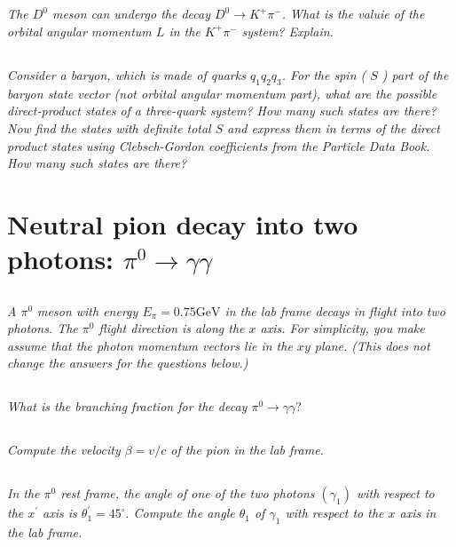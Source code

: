 \documentclass{article}
\begin{document}
\subsection{}
\textit{The $D^{0}$ meson can undergo the decay $D^{0} \rightarrow K^{+} \pi^{-}$. What is the valuie of the orbital angular momentum $L$ in the $K^{+} \pi^{-}$ system? Explain.}



\subsection{}
\textit{Consider a baryon, which is made of quarks $q_{1} q_{2} q_{3}$. For the spin ( $S$ ) part of the baryon state vector (not orbital angular momentum part), what are the possible direct-product states of a three-quark system? How many such states are there? Now find the states with definite total $S$ and express them in terms of the direct product states using Clebsch-Gordon coefficients from the Particle Data Book. How many such states are there?}

\newpage

\section{Neutral pion decay into two photons: $\pi^{0} \rightarrow \gamma \gamma$}


\subsection{}
\textit{A $\pi^{0}$ meson with energy $E_{\pi}=0.75 \mathrm{GeV}$ in the lab frame decays in flight into two photons. The $\pi^{0}$ flight direction is along the $x$ axis. For simplicity, you make assume that the photon momentum vectors lie in the $x y$ plane. (This does not change the answers for the questions below.)}


\subsection{}
\textit{What is the branching fraction for the decay $\pi^{0} \rightarrow \gamma \gamma ?$}


\subsection{}
\textit{Compute the velocity $\beta=v / c$ of the pion in the lab frame.}


\subsection{}
\textit{In the $\pi^{0}$ rest frame, the angle of one of the two photons $\left(\gamma_{1}\right)$ with respect to the $x^{\prime}$ axis is $\theta_{1}^{\prime}=45^{\circ} .$ Compute the angle $\theta_{1}$ of $\gamma_{1}$ with respect to the $x$ axis in the lab frame.}
\end{document}
